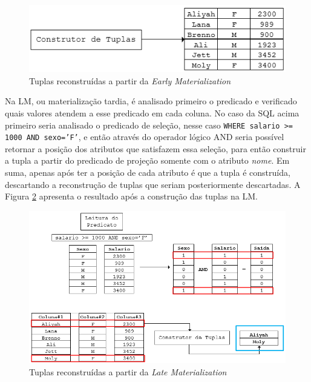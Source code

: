 \begin{figure}[htpb]
	\centering
        \includegraphics[width=14cm]{em}
	\caption{Tuplas reconstruídas a partir da \textit{Early Materialization}}
	\label{fig:em}
\end{figure}

Na LM, ou materialização tardia, é analisado primeiro o predicado e verificado quais valores atendem a esse predicado em cada coluna. 
No caso da SQL acima primeiro seria analisado o predicado de seleção, nesse caso \texttt{WHERE salario >= 1000 AND sexo='F'}, e então 
através do operador lógico AND seria possível retornar a posição dos atributos que satisfazem essa seleção, para então 
construir a tupla a partir do predicado de projeção somente com o atributo \textit{nome}. Em suma, apenas após ter a posição de cada atributo é que a tupla é construída, descartando a reconstrução de tuplas que seriam posteriormente descartadas. A Figura \ref{fig:lm} apresenta o resultado após a construção das tuplas na LM.

\begin{figure}[htpb]
	\centering
        \includegraphics[width=14cm]{lm}
	\caption{Tuplas reconstruídas a partir da \textit{Late Materialization}}
	\label{fig:lm}
\end{figure}



